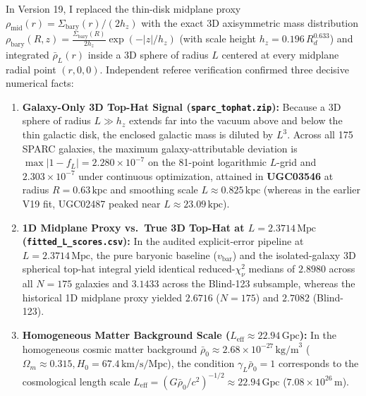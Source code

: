 \documentclass[10pt,a4paper]{article}
\begin{document}
\par
In Version 19, I replaced the thin-disk midplane proxy $\rho_{\text{mid}}(r) = \Sigma_{\text{bary}}(r)/(2h_z)$ with the exact 3D axisymmetric mass distribution $\rho_{\text{bary}}(R,z) = \frac{\Sigma_{\text{bary}}(R)}{2h_z}\exp(-|z|/h_z)$ (with scale height $h_z = 0.196\,R_d^{0.633}$) and integrated $\bar{\rho}_L(r)$ inside a 3D sphere of radius $L$ centered at every midplane radial point $(r,0,0)$. Independent referee verification confirmed three decisive numerical facts:
\begin{enumerate}\setlength{\itemsep}{1pt}\setlength{\parskip}{0pt}\setlength{\topsep}{1pt}
  \item \textbf{Galaxy-Only 3D Top-Hat Signal (\texttt{sparc\_tophat.zip}):} Because a 3D sphere of radius $L \gg h_z$ extends far into the vacuum above and below the thin galactic disk, the enclosed galactic mass is diluted by $L^3$. Across all 175 SPARC galaxies, the maximum galaxy-attributable deviation is $\max |1 - f_L| = 2.280\times 10^{-7}$ on the 81-point logarithmic $L$-grid and \textbf{$2.303\times 10^{-7}$} under continuous optimization, attained in \textbf{UGC03546} at radius $R = 0.63\,\text{kpc}$ and smoothing scale $L \approx 0.825\,\text{kpc}$ (whereas in the earlier V19 fit, UGC02487 peaked near $L \approx 23.09\,\text{kpc}$).
  \item \textbf{1D Midplane Proxy vs.\ True 3D Top-Hat at $L = 2.3714\,\text{Mpc}$ (\texttt{fitted\_L\_scores.csv}):} In the audited explicit-error pipeline at $L = 2.3714\,\text{Mpc}$, the pure baryonic baseline ($v_{\text{bar}}$) and the isolated-galaxy 3D spherical top-hat integral yield identical reduced-$\chi^2_\nu$ medians of \textbf{$2.8980$} across all $N=175$ galaxies and \textbf{$3.1433$} across the Blind-123 subsample, whereas the historical 1D midplane proxy yielded $2.6716$ ($N=175$) and $2.7082$ (Blind-123).
  \item \textbf{Homogeneous Matter Background Scale ($L_{\text{eff}} \approx 22.94\,\text{Gpc}$):} In the homogeneous cosmic matter background $\bar{\rho}_0 \approx 2.68\times 10^{-27}\,\text{kg/m}^3$ ($\Omega_m \approx 0.315, H_0 = 67.4\,\text{km/s/Mpc}$), the condition $\gamma_L\bar{\rho}_0 = 1$ corresponds to the cosmological length scale $L_{\text{eff}} = (G\bar{\rho}_0/c^2)^{-1/2} \approx 22.94\,\text{Gpc}$ ($7.08\times 10^{26}\,\text{m}$).
\end{enumerate}
\end{document}
